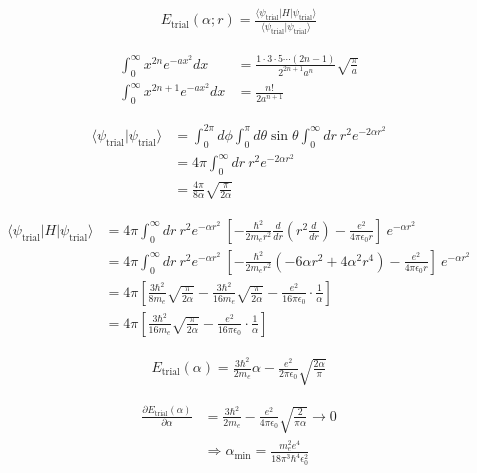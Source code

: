 \documentclass[11pt,pra,aps]{revtex4}
\begin{document}
    
\begin{align}
  E_\text{trial}(\alpha;r)=\frac{\langle \psi_\text{trial}|H|\psi_\text{trial}\rangle}{\langle \psi_\text{trial}|\psi_\text{trial}\rangle}
\end{align}

\begin{align}
  \int^\infty_0 x^{2n}e^{-ax^2}dx&=\frac{1\cdot3\cdot5\cdots(2n-1)}{2^{2n+1}a^n}\sqrt{\frac{\pi}{a}} \\
  \int^\infty_0 x^{2n+1}e^{-ax^2}dx&=\frac{n!}{2a^{n+1}}
\end{align}

\begin{align}
  \langle \psi_\text{trial}|\psi_\text{trial}\rangle &= \int^{2\pi}_0d\phi\int^{\pi}_{0}d\theta\sin\theta\int^{\infty}_{0} dr\ r^2 e^{-2\alpha r^2} \\
  &= 4\pi\int^{\infty}_{0} dr\ r^2 e^{-2\alpha r^2} \\
  &= \frac{4\pi }{8\alpha}\sqrt{\frac{\pi}{2\alpha}}
\end{align}

\begin{align}
  \langle \psi_\text{trial}|H|\psi_\text{trial}\rangle &= 4\pi\int^{\infty}_{0} dr\ r^2 e^{-\alpha r^2}\ \left[-\frac{\hbar^2}{2m_e r^2}\frac{d}{dr}\left(r^2\frac{d}{dr}\right)-\frac{e^2}{4\pi\epsilon_0 r}\right]\ e^{-\alpha r^2}\\
  &= 4\pi\int^{\infty}_{0} dr\ r^2 e^{-\alpha r^2}\ \left[-\frac{\hbar^2}{2m_e r^2}(-6\alpha r^2+4\alpha^2r^4)-\frac{e^2}{4\pi\epsilon_0 r}\right]\ e^{-\alpha r^2}\\
  &= 4\pi\left[ \frac{3\hbar^2}{8m_e} \sqrt{\frac{\pi}{2\alpha}}  - \frac{3\hbar^2}{16m_e} \sqrt{\frac{\pi}{2\alpha}} - \frac{e^2}{16\pi\epsilon_0}\cdot\frac{1}{\alpha} \right] \\
  &= 4\pi\left[ \frac{3\hbar^2}{16m_e} \sqrt{\frac{\pi}{2\alpha}}  - \frac{e^2}{16\pi\epsilon_0}\cdot\frac{1}{\alpha} \right]  
\end{align}

\begin{align}
  E_\text{trial}(\alpha)=\frac{3\hbar^2}{2m_e}\alpha - \frac{e^2}{2\pi\epsilon_0}\sqrt{\frac{2\alpha}{\pi}}
\end{align}

\begin{align}
  \frac{\partial E_\text{trial}(\alpha)}{\partial \alpha}&=\frac{3\hbar^2}{2m_e} - \frac{e^2}{4\pi\epsilon_0}\sqrt{\frac{2}{\pi\alpha}}\rightarrow 0 \\
  &\Rightarrow \alpha_\text{min} = \frac{m_e^2 e^4}{18\pi^3 \hbar^4 \epsilon_0^2}
\end{align}
\end{document}
